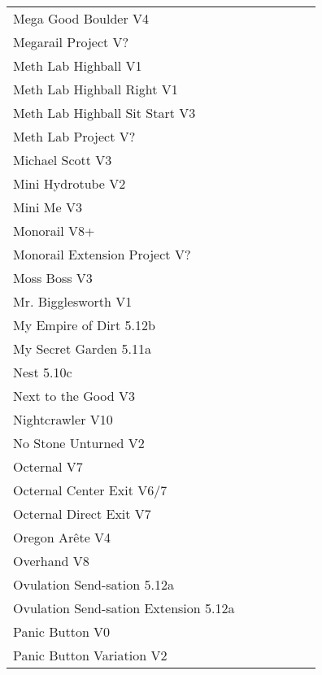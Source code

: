 \begin{flushleft}
\begin{center}
\begin{supertabular}{p{0.76\linewidth}p{0.08\linewidth}}
Mega Good Boulder V4 & \pageref{rt:MGB} \\
Megarail Project V? & \pageref{rt:Megarail Project} \\
Meth Lab Highball V1 & \pageref{rt:Meth Lab Highball} \\
Meth Lab Highball Right V1 & \pageref{rt:Meth Lab Highball Right} \\
Meth Lab Highball Sit Start V3 & \pageref{vr:Meth Lab Highball Sit Start} \\
Meth Lab Project V? & \pageref{rt:Meth Lab Project} \\
Michael Scott V3 & \pageref{rt:Michael Scott} \\
Mini Hydrotube V2 & \pageref{rt:Mini Hydrotube} \\
Mini Me V3 & \pageref{rt:Mini Me} \\
Monorail V8+ & \pageref{rt:Monorail} \\
Monorail Extension Project V? & \pageref{vr:Monorail Extension Project} \\
Moss Boss V3 & \pageref{rt:Moss Boss} \\
Mr. Bigglesworth V1 & \pageref{vr:Mr. Bigglesworth} \\
My Empire of Dirt 5.12b & \pageref{rt:My Empire of Dirt} \\
My Secret Garden 5.11a & \pageref{rt:My Secret Garden} \\
Nest 5.10c & \pageref{rt:Nest} \\
Next to the Good V3 & \pageref{rt:Next to the Good} \\
Nightcrawler V10 & \pageref{rt:Nightcrawler} \\
No Stone Unturned V2 & \pageref{rt:No Stone Unturned} \\
Octernal V7 & \pageref{rt:Octernal} \\
Octernal Center Exit V6/7 & \pageref{vr:Octernal Center Exit} \\
Octernal Direct Exit V7 & \pageref{vr:Octernal Direct Exit} \\
Oregon Arête V4 & \pageref{rt:Oregon Arête} \\
Overhand V8 & \pageref{rt:Overhand} \\
Ovulation Send-sation 5.12a & \pageref{rt:Ovulation Send-sation} \\
Ovulation Send-sation Extension 5.12a & \pageref{vr:Ovulation Send-sation Extension} \\
Panic Button V0 & \pageref{rt:Panic Button} \\
Panic Button Variation V2 & \pageref{vr:Panic Button Variation} \\

\end{supertabular}
\end{center}
\end{flushleft}

